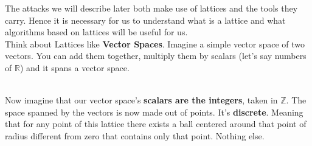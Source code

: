 \documentclass[a4paper,11pt]{article}
\begin{document}
The attacks we will describe later both make use of lattices and the tools they carry. Hence it is necessary for us to understand what is a lattice and what algorithms based on lattices will be useful for us.\\
Think about Lattices like \textbf{Vector Spaces}. Imagine a simple vector space of two vectors. You can add them together, multiply them by scalars (let's say numbers of $\mathbb{R}$) and it spans a vector space.\\

\\

Now imagine that our vector space's \textbf{scalars are the integers}, taken in $\mathbb{Z}$. The space spanned by the vectors is now made out of points. It's \textbf{discrete}. Meaning that for any point of this lattice there exists a ball centered around that point of radius different from zero that contains only that point. Nothing else.\\
\end{document}
